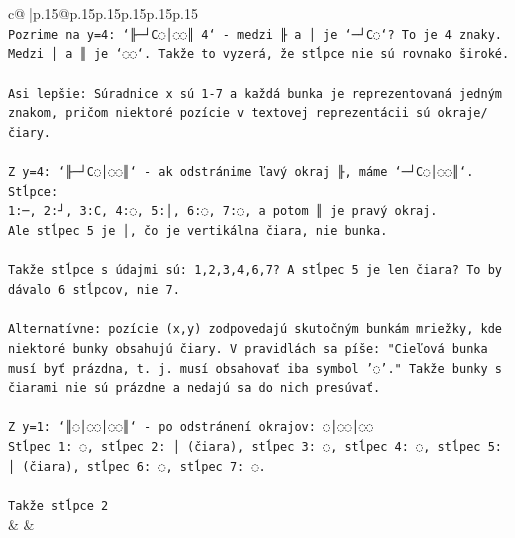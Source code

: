\documentclass{article}
\begin{document}
{\begin{supertabular}{c@{$\;$}|p{.15\linewidth}@{}p{.15\linewidth}p{.15\linewidth}p{.15\linewidth}p{.15\linewidth}p{.15\linewidth}}
{{{\\ 
\texttt{Pozrime na y=4: `╟─┘C◌│◌◌║ 4` {-} medzi ╟ a │ je `─┘C◌`? To je 4 znaky. Medzi │ a ║ je `◌◌`. Takže to vyzerá, že stĺpce nie sú rovnako široké.} \\
\\ 
\texttt{Asi lepšie: Súradnice x sú 1{-}7 a každá bunka je reprezentovaná jedným znakom, pričom niektoré pozície v textovej reprezentácii sú okraje/čiary.} \\
\\ 
\texttt{Z y=4: `╟─┘C◌│◌◌║` {-} ak odstránime ľavý okraj ╟, máme `─┘C◌│◌◌║`. Stĺpce:} \\
\texttt{1:─, 2:┘, 3:C, 4:◌, 5:│, 6:◌, 7:◌, a potom ║ je pravý okraj.} \\
\texttt{Ale stĺpec 5 je │, čo je vertikálna čiara, nie bunka.} \\
\\ 
\texttt{Takže stĺpce s údajmi sú: 1,2,3,4,6,7? A stĺpec 5 je len čiara? To by dávalo 6 stĺpcov, nie 7.} \\
\\ 
\texttt{Alternatívne: pozície (x,y) zodpovedajú skutočným bunkám mriežky, kde niektoré bunky obsahujú čiary. V pravidlách sa píše: "Cieľová bunka musí byť prázdna, t. j. musí obsahovať iba symbol '◌'." Takže bunky s čiarami nie sú prázdne a nedajú sa do nich presúvať.} \\
\\ 
\texttt{Z y=1: `║◌│◌◌│◌◌║` {-} po odstránení okrajov: ◌│◌◌│◌◌} \\
\texttt{Stĺpec 1: ◌, stĺpec 2: │ (čiara), stĺpec 3: ◌, stĺpec 4: ◌, stĺpec 5: │ (čiara), stĺpec 6: ◌, stĺpec 7: ◌.} \\
\\ 
\texttt{Takže stĺpce 2} \\
            }
        }
    }
    & & \\ \\


\end{supertabular}}
\end{document}

